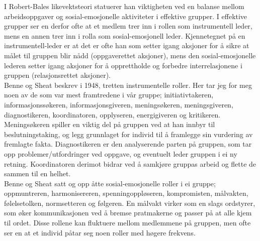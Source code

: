 I Robert-Bales likevektsteori statuerer han viktigheten ved en balanse mellom arbeidsoppgaver og sosial-emosjonelle aktiviteter i effektive grupper. I effektive grupper ser en derfor ofte at et medlem trer inn i rollen som instrumentell leder, mens en annen trer inn i rolla som sosial-emosjonell leder. Kjennetegnet på en instrumentell-leder er at det er ofte han som setter igang aksjoner for å sikre at målet til gruppen blir nådd (oppgaverettet aksjoner), mens den sosial-emosjonelle lederen setter igang aksjoner for å opprettholde og forbedre interrelasjonene i gruppen (relasjonsrettet aksjoner).\\


Benne og Sheat beskrev i 1948, tretten instrumentelle roller. Her tar jeg for meg noen av de som var mest framtredene i vår gruppe; initiativtakeren, informasjonssøkeren, informasjonsgiveren, meningsøkeren, meningsgiveren, diagnostikeren, koordinatoren, opplyseren, energigiveren og kritikeren.
Meningsøkeren spiller en viktig del på gruppen ved at han innbyr til beslutningstaking, og legg grunnlaget for individ til å framlegge sin vurdering av fremlagte fakta. Diagnostikeren er den analyserende parten på gruppen, som tar opp problemer/utfordringer ved oppgave, og eventuelt leder gruppen i ei ny retning. Koordinatoren derimot bidrar ved å samkjøre gruppas arbeid og flette de sammen til en helhet.\\

Benne og Sheat satt og opp åtte sosial-emosjonelle roller i ei gruppe; oppmuntreren, harmonisereren, spenningoppløseren, kompromisten, målvakten, følelsetolken, normsetteren og følgeren. En målvakt virker som en slags ordstyrer, som øker kommunikasjonen ved å bremse pratmakerne og passer på at alle kjem til ordet. Disse rollene kan fluktuere mellom medlemmene på gruppen, men ofte ser en at et individ påtar seg noen roller med høgere frekvens.\\
